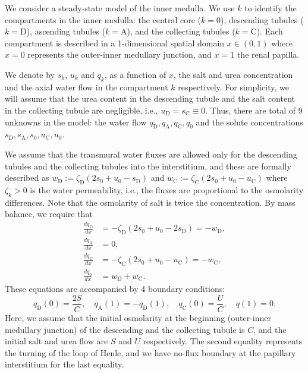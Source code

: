 \documentclass{article}
\numberwithin{equation}{section} %
\begin{document}
We consider a steady-state model of the inner medulla.
We use $k$ to identify the compartments in the inner medulla: the central core ($k=0$), descending tubules ($k=\mathrm{D}$), ascending tubules ($k=\mathrm{A}$), and the collecting tubules ($k=\mathrm{C}$).
Each compartment is described in a 1-dimensional spatial domain $x\in (0,1)$ where $x=0$ represents the outer-inner medullary junction, and $x=1$ the renal papilla.

We denote by $s_k$, $u_k$ and $q_k$, as a function of $x$, the salt and urea concentration and the axial water flow in the compartment $k$ respectively.
For simplicity, we will assume that the urea content in the descending tubule and the salt content in the collecting tubule are negligible, i.e., $u_\mathrm{D}=s_\mathrm{C}\equiv 0$.
Thus, there are total of 9 unknowns in the model: the water flow $q_\mathrm{D},q_\mathrm{A},q_\mathrm{C},q_0$ and the solute concentrations $s_\mathrm{D},s_\mathrm{A},s_0,u_\mathrm{C},u_0$.

We assume that the transmural water fluxes are allowed only for the descending tubules and the collecting tubules into the interstitium, and these are formally described as $w_\mathrm{D}:=\zeta_\mathrm{D}(2s_0+u_0-s_\mathrm{D})$ and $w_\mathrm{C}:=\zeta_\mathrm{C}(2s_0+u_0 - u_\mathrm{C})$ where $\zeta_k>0$ is the water permeability, i.e., the fluxes are proportional to the osmolarity differences.
Note that the osmolarity of salt is twice the concentration.
By mass balance, we require that
\begin{align}
    \frac{dq_\mathrm{D}}{dx} &= -\zeta_\mathrm{D}\left( 2s_0+u_0 - 2s_\mathrm{D} \right) = -w_\mathrm{D},\label{eq:q_D_eq}\\
    \frac{dq_\mathrm{A}}{dx} &= 0,\label{eq:q_A_eq}\\
    \frac{dq_\mathrm{C}}{dx} &= -\zeta_\mathrm{C}\left( 2s_0+u_0 - u_\mathrm{C} \right) = -w_\mathrm{C},\label{eq:q_C_eq}\\
    \frac{dq_0}{dx} &= w_\mathrm{D}+w_\mathrm{C}.\label{eq:q_0_eq}
\end{align}
These equations are accompanied by 4 boundary conditions:
\begin{equation}\label{eq:q_bdry}
    q_\mathrm{D}(0) = \frac{2S}{C},\quad q_\mathrm{A}(1) = -q_\mathrm{D}(1),\quad q_\mathrm{C}(0) = \frac{U}{C},\quad q(1) = 0.
\end{equation}
Here, we assume that the initial osmolarity at the beginning (outer-inner medullary junction) of the descending and the collecting tubule is $C$, and the initial salt and urea flow are $S$ and $U$ respectively.
The second equality represents the turning of the loop of Henle, and we have no-flux boundary at the papillary interstitium for the last equality.
\end{document}
